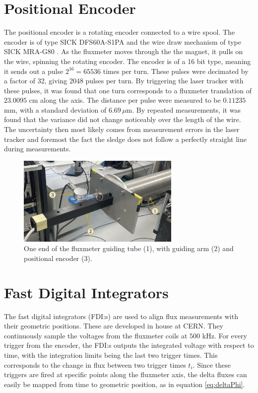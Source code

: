 \section{Positional Encoder}
The positional encoder is a rotating encoder connected to a wire spool.
The encoder is of type SICK DFS60A-S1PA \cite{noauthor_dfs60a-s1pa65536_nodate}
and the wire draw mechanism of type SICK MRA-G80 \cite{noauthor_mra-g080-103d3_nodate}.
As the fluxmeter moves through the the magnet, it pulls on the wire,
spinning the rotating encoder. The encoder is of a 16 bit type, meaning
it sends out a pulse $2^{16} = 65536$ times per turn. These pulses were
decimated by a factor of 32, giving 2048 pulses per turn. By triggering
the laser tracker with these pulses, it was found that one turn corresponds
to a fluxmeter translation of $23.0095$ cm along the axis. The distance
per pulse were measured to be $0.11235$ mm, with a standard deviation of
$6.69 \, \mu \text{m}$. By repeated measurements, it was found that the
variance did not change noticeably over the length of the wire. The
uncertainty then most likely comes from measurement errors in the laser
tracker and foremost the fact the sledge does not follow a perfectly
straight line during measurements.

\begin{figure}[h]
    \centering
    \includegraphics[width=0.7\textwidth]{figs/encoder}
    \caption{One end of the fluxmeter guiding tube (1), with guiding arm (2)
        and positional encoder (3).}
    \label{fig:encoderpic}
\end{figure}

\section{Fast Digital Integrators}
The fast digital integrators (FDI:s) are used to align flux measurements
with their geometric positions. These are developed in house at CERN.
\cite{arpaia_fast_2006}
They continuously sample the voltages
from the fluxmeter coils at $500$ kHz. For every trigger from the encoder,
the FDI:s outputs the integrated voltage with respect to time, with the
integration limits being the last two trigger times. This
corresponds to the change in flux between two trigger times $t_i$. Since these
triggers are fired at specific points along the fluxmeter axis, the
delta fluxes can easily be mapped from time to geometric position, as in
equation \ref{eq:deltaPhi}.

